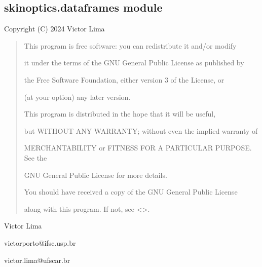 \documentclass[letterpaper,10pt,english]{sphinxmanual}
\begin{document}
\sphinxstepscope


\subsection{skinoptics.dataframes module}
\label{\detokenize{02_dataframes:module-skinoptics.dataframes}}\label{\detokenize{02_dataframes:skinoptics-dataframes-module}}\label{\detokenize{02_dataframes::doc}}
\sphinxAtStartPar
Copyright (C) 2024 Victor Lima
\begin{quote}

\begin{DUlineblock}{0em}
\item[] This program is free software: you can redistribute it and/or modify
\item[] it under the terms of the GNU General Public License as published by
\item[] the Free Software Foundation, either version 3 of the License, or
\item[] (at your option) any later version.
\end{DUlineblock}

\begin{DUlineblock}{0em}
\item[] This program is distributed in the hope that it will be useful,
\item[] but WITHOUT ANY WARRANTY; without even the implied warranty of
\item[] MERCHANTABILITY or FITNESS FOR A PARTICULAR PURPOSE.  See the
\item[] GNU General Public License for more details.
\end{DUlineblock}

\begin{DUlineblock}{0em}
\item[] You should have received a copy of the GNU General Public License
\item[] along with this program.  If not, see \textless{}\textgreater{}.
\end{DUlineblock}
\end{quote}

\begin{DUlineblock}{0em}
\item[] Victor Lima
\item[] victorporto@ifsc.usp.br
\item[] victor.lima@ufscar.br
\end{DUlineblock}
\end{document}
